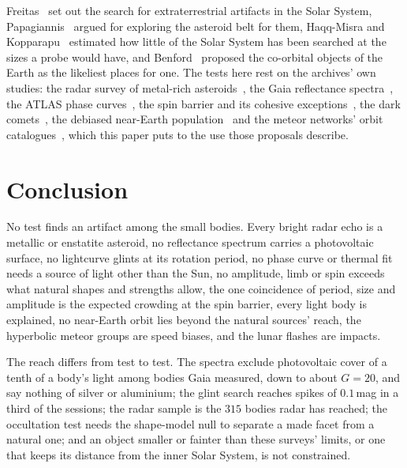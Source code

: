 \documentclass[3p,11pt]{elsarticle}
\begin{document}
Freitas~\cite{Freitas1983} set out the search for extraterrestrial artifacts in the
Solar System, Papagiannis~\cite{Papagiannis1983} argued for exploring the asteroid belt
for them, Haqq-Misra and Kopparapu~\cite{HaqqMisra2012} estimated how little of the
Solar System has been searched at the sizes a probe would have, and
Benford~\cite{Benford2019} proposed the co-orbital objects of the Earth as the likeliest
places for one. The tests here rest on
the archives' own studies: the radar survey of metal-rich asteroids~\cite{Shepard2015},
the Gaia reflectance spectra~\cite{Galluccio2023}, the ATLAS phase
curves~\cite{Mahlke2021}, the spin barrier and its cohesive
exceptions~\cite{Pravec2000,Holsapple2007}, the dark comets~\cite{Seligman2023}, the
debiased near-Earth population~\cite{Granvik2018} and the meteor networks' orbit
catalogues~\cite{Vida2021,SonotaCo2009}, which this paper puts to the use those
proposals describe.

\section{Conclusion}\label{sec:conclusion}

No test finds an artifact among the small bodies. Every bright radar echo is a metallic
or enstatite asteroid, no reflectance spectrum carries a photovoltaic surface, no
lightcurve glints at its rotation period, no phase curve or thermal fit needs a source
of light other than the Sun, no amplitude, limb or spin exceeds what natural shapes and
strengths allow, the one coincidence of period, size and amplitude is the expected
crowding at the spin barrier, every light body is explained, no near-Earth orbit lies
beyond the natural sources' reach, the hyperbolic meteor groups are speed biases, and the
lunar flashes are impacts.

The reach differs from test to test. The spectra exclude photovoltaic cover of a tenth of
a body's light among bodies Gaia measured, down to about $G=20$, and say nothing of
silver or aluminium; the glint search reaches spikes of $0.1$\,mag in a third of the
sessions; the radar sample is the $315$ bodies radar has reached; the occultation test
needs the shape-model null to separate a made facet from a natural one; and an object
smaller or fainter than these surveys' limits, or one that keeps its distance from the
inner Solar System, is not constrained.
\end{document}

